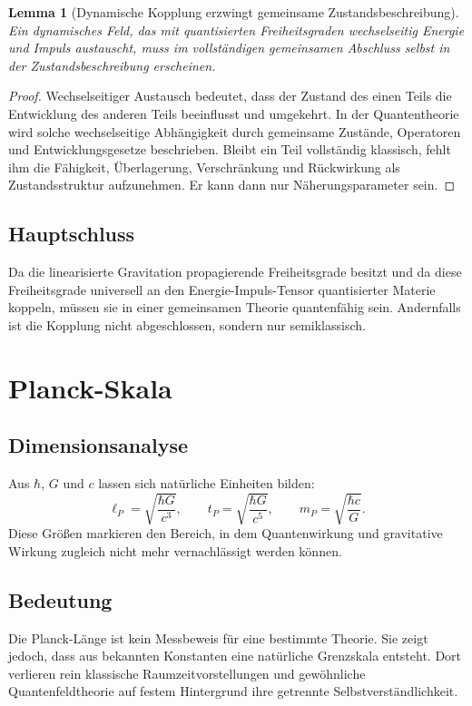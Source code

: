 \documentclass[11pt,a4paper,openany]{book}
\newtheorem{lemma}{Lemma}[chapter]
\theoremstyle{remark}
\begin{document}
\begin{lemma}[Dynamische Kopplung erzwingt gemeinsame Zustandsbeschreibung]
Ein dynamisches Feld, das mit quantisierten Freiheitsgraden wechselseitig Energie und Impuls austauscht, muss im vollständigen gemeinsamen Abschluss selbst in der Zustandsbeschreibung erscheinen.
\end{lemma}
\begin{proof}
Wechselseitiger Austausch bedeutet, dass der Zustand des einen Teils die Entwicklung des anderen Teils beeinflusst und umgekehrt. In der Quantentheorie wird solche wechselseitige Abhängigkeit durch gemeinsame Zustände, Operatoren und Entwicklungsgesetze beschrieben. Bleibt ein Teil vollständig klassisch, fehlt ihm die Fähigkeit, Überlagerung, Verschränkung und Rückwirkung als Zustandsstruktur aufzunehmen. Er kann dann nur Näherungsparameter sein.
\end{proof}

\section{Hauptschluss}
Da die linearisierte Gravitation propagierende Freiheitsgrade besitzt und da diese Freiheitsgrade universell an den Energie-Impuls-Tensor quantisierter Materie koppeln, müssen sie in einer gemeinsamen Theorie quantenfähig sein. Andernfalls ist die Kopplung nicht abgeschlossen, sondern nur semiklassisch.

\chapter{Planck-Skala}
\section{Dimensionsanalyse}
Aus $\hbar$, $G$ und $c$ lassen sich natürliche Einheiten bilden:
\begin{equation}
\ell_P=\sqrt{\frac{\hbar G}{c^3}},\qquad
 t_P=\sqrt{\frac{\hbar G}{c^5}},\qquad
 m_P=\sqrt{\frac{\hbar c}{G}}.
\end{equation}
Diese Größen markieren den Bereich, in dem Quantenwirkung und gravitative Wirkung zugleich nicht mehr vernachlässigt werden können.

\section{Bedeutung}
Die Planck-Länge ist kein Messbeweis für eine bestimmte Theorie. Sie zeigt jedoch, dass aus bekannten Konstanten eine natürliche Grenzskala entsteht. Dort verlieren rein klassische Raumzeitvorstellungen und gewöhnliche Quantenfeldtheorie auf festem Hintergrund ihre getrennte Selbstverständlichkeit.
\end{document}
